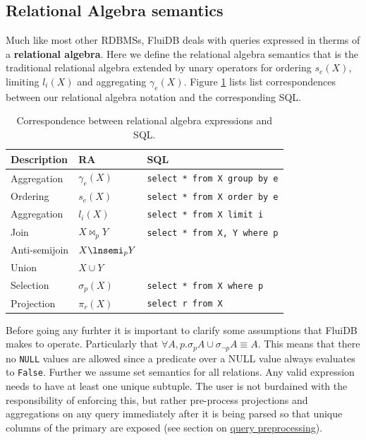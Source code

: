\subsection{Relational Algebra semantics}
\label{sec:relational_algebra_semantics}
Much like most other RDBMSs, FluiDB deals with queries expressed in
therms of a \textbf{relational algebra}.  Here we define the relational
algebra semantics that is the traditional relational algebra extended
by unary operators for ordering \(s_e(X)\), limiting \(l_i(X)\) and
aggregating \(\gamma_e(X)\). Figure \ref{tab:org602cd71} lists list correspondences
between our relational algebra notation and the corresponding SQL.

\begin{table}[p]
  \caption{\label{tab:org602cd71}Correspondence between relational algebra expressions and SQL.}
  \centering
  \begin{tabular}{lll}
    Description & RA & SQL\\
    \hline
    Aggregation & \(\gamma_e(X)\) & \texttt{select * from X group by e}\\
    Ordering & \(s_e(X)\) & \texttt{select * from X order by e}\\
    Aggregation & \(l_i(X)\) & \texttt{select * from X limit i}\\
    Join & \(X \Join_p Y\) & \texttt{select * from X, Y where p}\\
    Anti-semijoin & \(X \lnsemi_p Y\) & \\
    Union & \(X \cup Y\) & \\
    Selection & \(\sigma_p(X)\) & \texttt{select * from X where p}\\
    Projection & \(\pi_r(X)\) & \texttt{select r from X}\\
  \end{tabular}
\end{table}

Before going any furhter it is important to clarify some assumptions
that FluiDB makes to operate. Particularly that \(\forall A,p
. \sigma_p A \cup \sigma_{\neg p} A \equiv A\). This means that there
no \texttt{NULL} values are allowed since a predicate over a NULL value
always evaluates to \texttt{False}. Further we assume set semantics for all
relations. Any valid expression needs to have at least one unique
subtuple. The user is not burdained with the responsibility of
enforcing this, but rather pre-process projections and aggregations on
any query immediately after it is being parsed so that unique columns
of the primary are exposed (see section on \hyperref[sec:orgd903905]{query preprocessing}).


